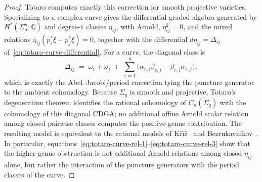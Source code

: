 \begin{proof}
Totaro computes exactly this correction for smooth projective
varieties. Specializing \cite[Theorem~1]{Totaro96} to a complex curve
gives the differential graded algebra generated by
$H^*(\Sigma_g^n;\mathbb{Q})$ and degree-$1$ classes $\eta_{ij}$, with
Arnold, $\eta_{ij}^2=0$, and the mixed relations
$\eta_{ij}(p_i^*\xi-p_j^*\xi)=0$, together with the differential
$d\eta_{ij}=\Delta_{ij}$ of~\eqref{eq:totaro-curve-differential}. For a
curve, the diagonal class is
\[
\Delta_{ij}
\;=\;
\omega_i+\omega_j
\;+\;
\sum_{r=1}^g
\bigl(\alpha_{r,i}\beta_{r,j}-\beta_{r,i}\alpha_{r,j}\bigr),
\]
which is exactly the Abel--Jacobi/period correction tying the puncture
generator to the ambient cohomology. Because $\Sigma_g$ is smooth and
projective, Totaro's degeneration theorem
\cite[Theorem~3]{Totaro96} identifies the rational cohomology of
$C_n(\Sigma_g)$ with the cohomology of this diagonal CDGA; no
additional affine Arnold scalar relation among closed pairwise classes computes
the positive-genus contribution.
The resulting model is equivalent to the rational models of
K\v{r}\'{\i}\v{z}~\cite{Kriz94} and
Bezrukavnikov~\cite{Bezrukavnikov94}. In particular,
equations~\eqref{eq:totaro-curve-rel-1}--\eqref{eq:totaro-curve-rel-3}
show that the higher-genus obstruction is not additional Arnold
relations among closed $\eta_{ij}$ alone, but rather the interaction of
the puncture generators with the period classes of the curve.
\end{proof}

